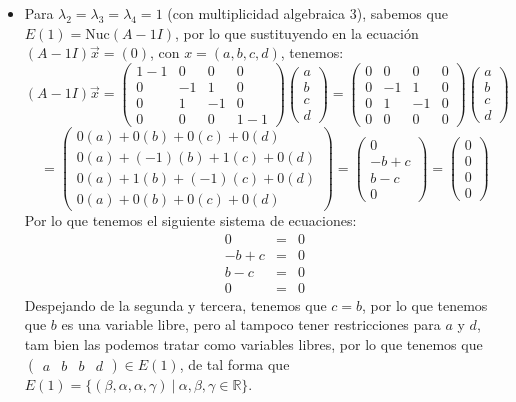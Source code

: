 \begin{itemize}
\begin{itemize}
\item Para $\lambda_2=\lambda_3=\lambda_4=1$ (con multiplicidad algebraica 3), sabemos que $E(1)=\text{Nuc}(A-1I)$, por lo que sustituyendo en la ecuaci\'on $(A-1I)\vec{x}=(0)$, con $x=(a,b,c,d)$, tenemos:
    \[(A-1I)\vec{x}=\begin{pmatrix}
    1-1 & 0 & 0 & 0\\
    0 & -1 & 1 & 0\\
    0 & 1 & -1 & 0\\
    0 & 0 & 0 & 1-1\end{pmatrix}\begin{pmatrix}a\\b\\c\\d\end{pmatrix}=\begin{pmatrix}
    0 & 0 & 0 & 0\\
    0 & -1 & 1 & 0\\
    0 & 1 & -1 & 0\\
    0 & 0 & 0 & 0\end{pmatrix}\begin{pmatrix}a\\b\\c\\d\end{pmatrix}\]\[=\begin{pmatrix}0(a)+0(b)+0(c)+0(d)\\0(a)+(-1)(b)+1(c)+0(d)\\0(a)+1(b)+(-1)(c)+0(d)\\0(a)+0(b)+0(c)+0(d)\end{pmatrix}=\begin{pmatrix}0\\-b+c\\b-c\\0\end{pmatrix}=\begin{pmatrix}0\\0\\0\\0\end{pmatrix}\]
    Por lo que tenemos el siguiente sistema de ecuaciones:
\begin{eqnarray*}
0&=&0\\
-b+c&=&0\\
b-c&=&0\\
0&=&0
\end{eqnarray*}
Despejando de la segunda y tercera, tenemos que $c=b$, por lo que tenemos que $b$ es una variable libre, pero al tampoco tener restricciones para $a$ y $d$, tam bien las podemos tratar como variables libres, por lo que tenemos que $\begin{pmatrix}a&b&b&d\end{pmatrix}\in E(1)$, de tal forma que $E(1)=\{(\beta,\alpha,\alpha,\gamma)~|~\alpha,\beta,\gamma\in\mathbb{R}\}$.\\

\end{itemize}
\end{itemize}
